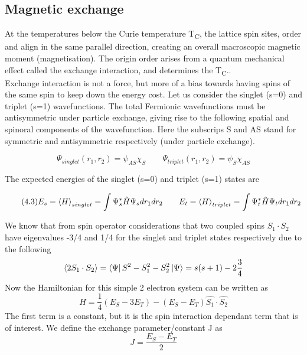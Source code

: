 \documentclass[12pt]{article}
\begin{document}
\subsection{Magnetic exchange}

At the temperatures below the Curie temperature T\textsubscript{C}, the lattice spin sites, order and align in the same parallel direction, creating an overall macroscopic magnetic moment (magnetisation). The origin order arises from a quantum mechanical effect called the exchange interaction, and determines the T\textsubscript{C}.. 
\\
Exchange interaction is not a force, but more of a bias towards having spins of the same spin to keep down the energy cost. Let us consider the singlet (s=0) and triplet (s=1) wavefunctions. The total Fermionic wavefunctions must be antisymmetric under particle exchange, giving rise to the following spatial and spinoral components of the wavefunction. Here the subscrips S and AS stand for symmetric and antisymmetric respectively (under particle exchange).

\begin{equation} \label{4.1} \tag{4.3}
\Psi_{singlet}(r_1,r_2)=\psi_{AS}\chi_S \qquad \Psi_{triplet}(r_1,r_2)=\psi_{S}\chi_{AS}
\end{equation}

The expected energies of the singlet (s=0) and triplet (s=1) states are

\begin{equation} \label{4.1} \tag{4.3}
E_s=\expval{H}_{singlet}=\int \Psi_s^*\hat{H}\Psi_sdr_1dr_2 \qquad E_t=\expval{H}_{triplet}=\int \Psi_t^*\hat{H}\Psi_tdr_1dr_2
\end{equation}



We know that from spin operator considerations that two coupled spins $S_1\cdot S_2$ have eigenvalues -3/4 and 1/4 for the singlet and triplet states respectively\cite{blundell} due to the following
$$\expval{2S_1\cdot S_2}=\bra{\Psi}S^2-S_1^2-S_2^2\ket{\Psi}=s(s+1)-2\frac{3}{4}$$
Now the Hamiltonian for this simple 2 electron system can be written as
$$H=\frac{1}{4}(E_S-3E_T)-(E_S-E_T)\hat{S_1} \cdot \hat{S_2}$$ 
The first term is a constant, but it is the spin interaction dependant term that is of interest.
We define the exchange parameter/constant J \cite{blundell}as
$$J=\frac{E_S-E_T}{2}$$
\end{document}

